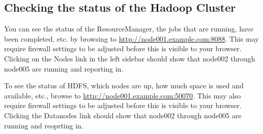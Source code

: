 \subsection{Checking the status of the Hadoop Cluster}
You can see the status of the ResourceManager, the jobs
that are running, have been completed, etc. by browsing to
\url{http://node001.example.com:8088}.  This may require firewall settings
to be adjusted before this is visible to your browser.  Clicking on the
Nodes link in the left sidebar should show that node002 through node005
are running and reporting in.

To see the status of HDFS, which nodes are up, how much space is used
and available, etc., browse to \url{http://node001.example.com:50070}.
This may also require firewall settings to be adjusted before this is
visible to your browser.  Clicking the Datanodes link should show that
node002 through node005 are running and reoprting in.
